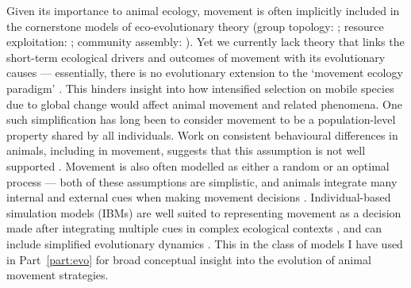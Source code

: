 Given its importance to animal ecology, movement is often implicitly included in the cornerstone models of eco-evolutionary theory (group topology: \cite{hamilton1971}; resource exploitation: \cite{fretwell1970, charnov1976}; community assembly: \cite{macarthur1967}).
Yet we currently lack theory that links the short-term ecological drivers and outcomes of movement with its evolutionary causes --- essentially, there is no evolutionary extension to the `movement ecology paradigm' \citep{holyoak2008}.
This hinders insight into how intensified selection on mobile species due to global change \citep[e.g.][]{vangils2016} would affect animal movement and related phenomena.
One such simplification has long been to consider movement to be a population-level property shared by all individuals.
Work on consistent behavioural differences in animals, including in movement, suggests that this assumption is not well supported \citep{spiegel2017,shaw2020,stuber2022,webber2018,webber2020,abrahms2017}.
Movement is also often modelled as either a random or an optimal process --- both of these assumptions are simplistic, and animals integrate many internal and external cues when making movement decisions \citep{nathan2008a}.
Individual-based simulation models (IBMs) are well suited to representing movement as a decision made after integrating multiple cues in complex ecological contexts \citep{huston1988,deangelis2019}, and can include simplified evolutionary dynamics \citep{getz2015,getz2016,netz2021}.
This in the class of models I have used in Part~\ref{part:evo} for broad conceptual insight into the evolution of animal movement strategies.

